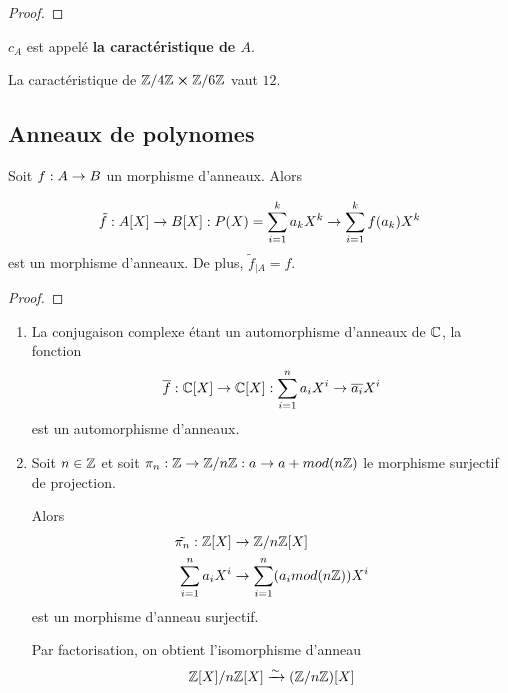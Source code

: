 \ifdefined\outputproof
\begin{proof}

\end{proof}
\fi

\begin{definition}
	$c_{A}$ est appelé \textbf{la caractéristique de $A$}.
\end{definition}

\begin{exemple}
	La caractéristique de $\mathbb{Z}/4\mathbb{Z} \cross \mathbb{Z}/6\mathbb{Z}$ vaut
	$12$.
\end{exemple}

\subsection{Anneaux de polynomes}

\begin{proposition}
	Soit $f : A \rightarrow B$ un morphisme d'anneaux. Alors

	\begin{equation}
		\tilde{f} : A[X] \rightarrow B[X] : P(X) = \sum_{i = 1}^{k} a_{k} X^{k}
	\rightarrow \sum_{i = 1}^{k} f(a_{k}) X^{k}
	\end{equation}
	est un morphisme d'anneaux. De plus, $\tilde{f}_{|A} = f$.
\end{proposition}

\ifdefined\outputproof
\begin{proof}

\end{proof}
\fi

\begin{exemple}
	\begin{enumerate}
		\item La conjugaison complexe étant un automorphisme d'anneaux de
			$\mathbb{C}$, la fonction
			\begin{equation}
				\overline{f} : \mathbb{C}[X] \rightarrow \mathbb{C}[X] : \sum_{i =
				1}^{n} a_{i} X^{i} \rightarrow \overline{a_{i}} X^{i}
			\end{equation}
			est un automorphisme d'anneaux.
		\item Soit $n \in \mathbb{Z}$ et soit $\pi_{n} : \mathbb{Z} \rightarrow
			\mathbb{Z} / n \mathbb{Z} : a \rightarrow a + mod(n \mathbb{Z})$ le morphisme surjectif de
		projection.

		Alors
		\begin{align}
			\tilde{\pi_{n}} : \mathbb{Z}[X] & \rightarrow \mathbb{Z} / n \mathbb{Z}[X]
			\\
			\sum_{i = 1}^{n} a_{i} X^{i} & \rightarrow \sum_{i = 1}^{n} (a_{i}
			mod(n \mathbb{Z})) X^{i}
		\end{align}
		est un morphisme d'anneau surjectif.

		Par factorisation, on obtient l'isomorphisme d'anneau
		\begin{equation}
			\mathbb{Z}[X] / n \mathbb{Z}[X] \xrightarrow{\sim} (\mathbb{Z}
			/ n \mathbb{Z})[X]
		\end{equation}

	\end{enumerate}
\end{exemple}

